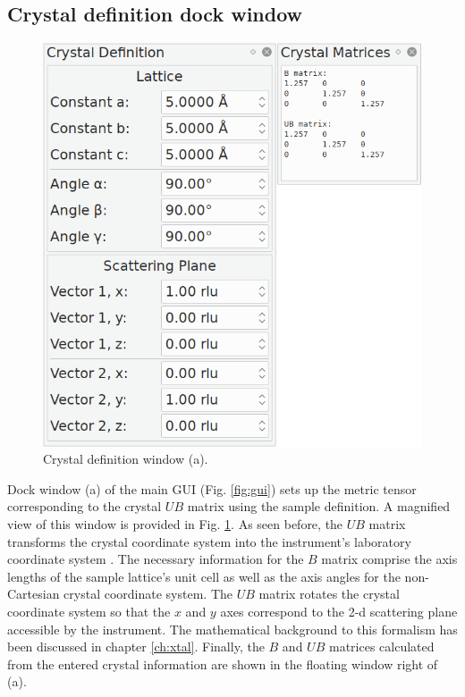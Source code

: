 \subsection{Crystal definition dock window}
\label{sec:gui_xtal}
\begin{minipage}{1 \textwidth}
\setlength{\intextsep}{0.25cm}
\begin{figure}
	\vspace{-0.25cm}
	\includegraphics[width = 0.45 \textwidth]{figures/gui_xtal}
	\caption[Crystal definition window.]{Crystal definition window (a).
		\label{fig:gui_xtal}}
\end{figure}

Dock window (a) of the main GUI (Fig. \ref{fig:gui}) sets up the metric tensor \cite[pp. 807-809]{Arens2015}
corresponding to the crystal $UB$ matrix using the sample definition.
A magnified view of this window is provided in Fig. \ref{fig:gui_xtal}. 
As seen before, the $UB$ matrix transforms the crystal coordinate system into the instrument's 
laboratory coordinate system \cite{Lumsden2005}.
The necessary information for the $B$ matrix comprise the axis lengths of the sample lattice's
unit cell as well as the axis angles for the non-Cartesian crystal coordinate system.
The $UB$ matrix rotates the crystal coordinate system so that the $x$ and $y$ axes correspond
to the 2-d scattering plane accessible by the instrument.
The mathematical background to this formalism has been discussed in chapter \ref{ch:xtal}.
Finally, the $B$ and $UB$ matrices calculated from the entered crystal information are shown 
in the floating window right of (a).
\end{minipage}
\vspace{0.5cm}



